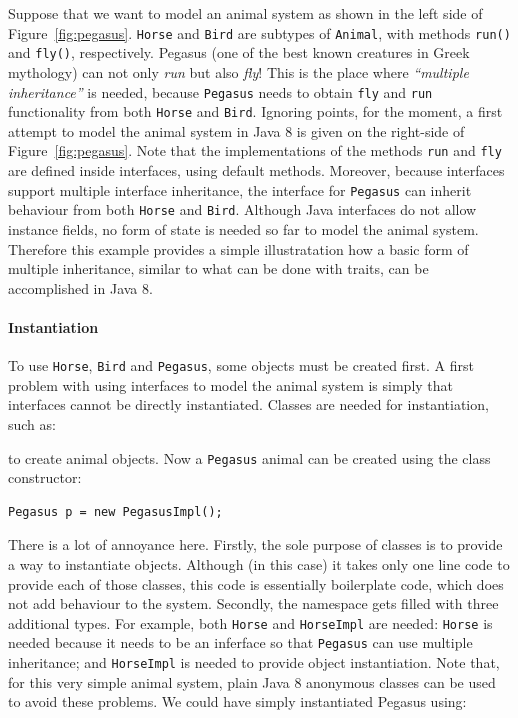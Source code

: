 Suppose that we want to model an animal system as shown in
the left side of Figure~\ref{fig:pegasus}. \texttt{Horse} and \texttt{Bird} are subtypes
of \texttt{Animal}, with methods \texttt{run()} and \texttt{fly()},
respectively. Pegasus (one of the best known creatures in Greek
mythology) can not only \emph{run} but also \emph{fly}! This is the
place where \emph{``multiple inheritance''} is needed, because
\texttt{Pegasus} needs to obtain \texttt{fly} and \texttt{run}
functionality from both \texttt{Horse} and \texttt{Bird}.
Ignoring points, for the moment, a 
first attempt to model the animal system in Java 8 is given on the right-side 
of Figure~\ref{fig:pegasus}.
Note that the implementations of the methods \texttt{run}
and \texttt{fly} are defined inside interfaces, using default
methods. Moreover, because interfaces support multiple interface
inheritance, the interface for \texttt{Pegasus} can inherit behaviour
from both \texttt{Horse} and \texttt{Bird}. Although Java interfaces
do not allow instance fields, no form of state is needed so far to
model the animal system.  Therefore this example provides a simple
illustratation how a basic form of multiple inheritance, similar to
what can be done with traits, can be accomplished in Java 8.

\paragraph{Instantiation}
To use \texttt{Horse}, \texttt{Bird} and \texttt{Pegasus}, some
objects must be created first. A first problem with using
interfaces to model the animal system is simply that interfaces 
cannot be directly instantiated. Classes are needed for instantiation, such as:


\noindent to create animal objects. Now a \texttt{Pegasus} animal can be created
using the class constructor:

\begin{lstlisting}
Pegasus p = new PegasusImpl();
\end{lstlisting}

\noindent There is a lot of annoyance here. Firstly, the sole
purpose of classes is to provide a way to instantiate
objects. Although (in this case) it takes only one line code to
provide each of those classes, this code is essentially boilerplate
code, which does not add behaviour to the system. Secondly, 
the namespace gets filled with three additional types. For example, 
both \texttt{Horse} and \texttt{HorseImpl} are needed: \texttt{Horse}
is needed because it needs to be an inferface so that \texttt{Pegasus}
can use multiple inheritance; and \texttt{HorseImpl} is needed to
provide object instantiation. 
Note that, for this very simple animal system, plain Java 8 anonymous
classes can be used to avoid these problems.  We could have simply
instantiated Pegasus using:

